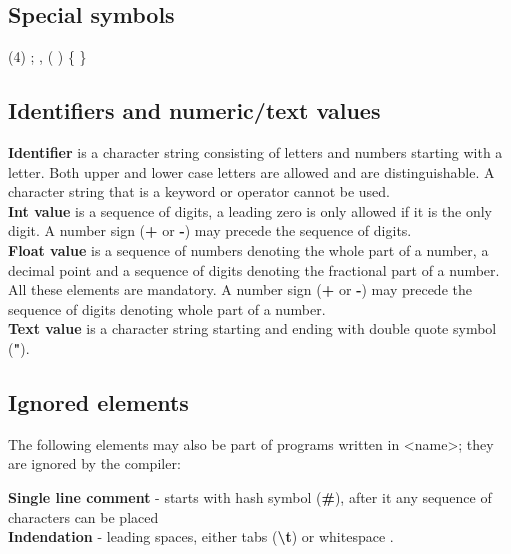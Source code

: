 \documentclass{ol-softwaremanual}
\begin{document}
\subsection{Special symbols}

\begin{tasks}[label = {\bf \arabic*.}, label-align=left, label-offset={0mm}, label-width={5mm}, item-indent={5mm}, label-format={\bfseries}, column-sep=10mm](4)
\task ;
\task ,
\task (
\task )
\task \{
\task \}
\end{tasks}

\subsection{Identifiers and numeric/text values}


\textbf{Identifier} is a character string consisting of letters and numbers starting with a letter. Both upper and lower case letters are allowed and are distinguishable. A character string that is a keyword or operator cannot be used.\\[1\baselineskip]


\textbf{Int value} is a sequence of digits, a leading zero is only allowed if it is the only digit. A number sign (\textbf{+} or \textbf{-}) may precede the sequence of digits. \\[1\baselineskip]

\textbf{Float value} is a sequence of numbers denoting the whole part of a number, a decimal point and a sequence of digits denoting the fractional part of a number. All these elements are mandatory. A number sign (\textbf{+} or \textbf{-}) may precede the sequence of digits denoting whole part of a number. \\[1\baselineskip]

\textbf{Text value} is a character string starting and ending with double quote symbol (\textbf{"}). \\[1\baselineskip]

\subsection{Ignored elements}
The following elements may also be part of programs written in <name>; they are ignored by the compiler:

\textbf{Single line comment} - starts with hash symbol (\textbf{\#}), after it any sequence of characters can be placed\\[1\baselineskip]
\textbf{Indendation} - leading spaces, either tabs (\textbf{\textbackslash t}) or whitespace .
\end{document}
